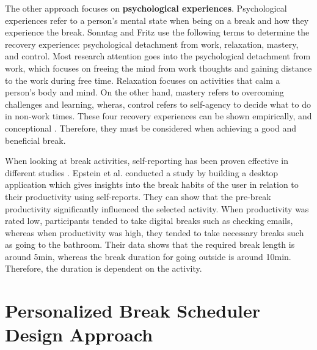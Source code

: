 \documentclass{hasel_thesis}
\begin{document}
The other approach focuses on \textbf{psychological experiences}. Psychological experiences refer to a person's mental state when being on a break and how they experience the break. Sonntag and Fritz \cite{Sonnentag.2017} use the following terms to determine the recovery experience: psychological detachment from work, relaxation, mastery, and control. Most research attention goes into the psychological detachment from work, which focuses on freeing the mind from work thoughts and gaining distance to the work during free time. Relaxation focuses on activities that calm a person's body and mind. On the other hand, mastery refers to overcoming challenges and learning, wheras, control refers to self-agency to decide what to do in non-work times. These four recovery experiences can be shown empirically, and conceptional \cite{sonnentag.2007}. Therefore, they must be considered when achieving a good and beneficial break.


When looking at break activities, self-reporting has been proven effective in different studies \cite{Bloom.2014, epstein.2016t}. Epstein et al. \cite{epstein.2016t} conducted a study by building a desktop application which gives insights into the break habits of the user in relation to their productivity using self-reports. They can show that the pre-break productivity significantly influenced the selected activity. When productivity was rated low, participants tended to take digital breaks such as checking emails, whereas when productivity was high, they tended to take necessary breaks such as going to the bathroom. Their data shows that the required break length is around 5min, whereas the break duration for going outside is around 10min. Therefore, the duration is dependent on the activity.



\chapter{Personalized Break Scheduler Design Approach} \label{design_approach}
\end{document}
